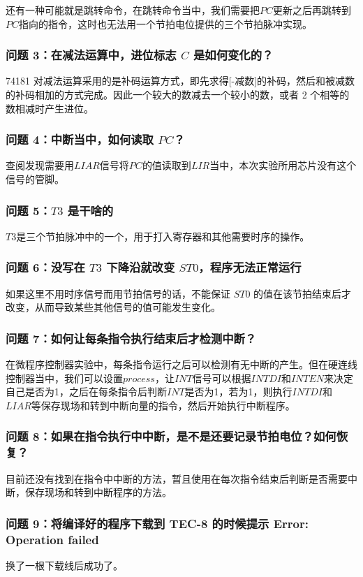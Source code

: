 \documentclass[12pt]{article}
\begin{document}
{            还有一种可能就是跳转命令，在跳转命令当中，我们需要把$PC$更新之后再跳转到$PC$指向的指令，这时也无法用一个节拍电位提供的三个节拍脉冲实现。
            
        \subsubsection{问题 3：在减法运算中，进位标志 $C$ 是如何变化的？}
            74181 对减法运算采用的是补码运算方式，即先求得[-减数]的补码，然后和被减数的补码相加的方式完成。因此一个较大的数减去一个较小的数，或者 2 个相等的数相减时产生进位。
        \subsubsection{问题 4：中断当中，如何读取 $PC$？}
            查阅发现需要用$LIAR$信号将$PC$的值读取到$LIR$当中，本次实验所用芯片没有这个信号的管脚。
        \subsubsection{问题 5：$T3$ 是干啥的}
            $T3$是三个节拍脉冲中的一个，用于打入寄存器和其他需要时序的操作。
        \subsubsection{问题 6：没写在 $T3$ 下降沿就改变 $ST0$，程序无法正常运行}
            如果这里不用时序信号而用节拍信号的话，不能保证 $ST0$ 的值在该节拍结束后才改变，从而导致某些其他信号的值可能发生变化。
        \subsubsection{问题 7：如何让每条指令执行结束后才检测中断？}
            在微程序控制器实验中，每条指令运行之后可以检测有无中断的产生。但在硬连线控制器当中，我们可以设置$process$，让$INT$信号可以根据$INTDI$和$INTEN$来决定自己是否为1，之后在每条指令后判断$INT$是否为1，若为1，则执行$INTDI$和$LIAR$等保存现场和转到中断向量的指令，然后开始执行中断程序。
        \subsubsection{问题 8：如果在指令执行中中断，是不是还要记录节拍电位？如何恢复？}
            目前还没有找到在指令中中断的方法，暂且使用在每次指令结束后判断是否需要中断，保存现场和转到中断程序的方法。
        \subsubsection{问题 9：将编译好的程序下载到 TEC-8 的时候提示 Error: Operation failed}
            换了一根下载线后成功了。
}
\end{document}
